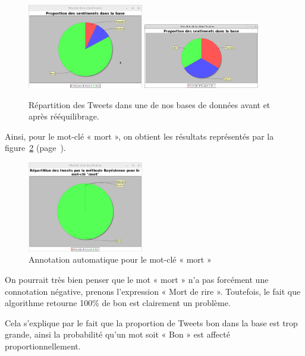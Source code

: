 \documentclass[12pt,a4paper]{report}
\begin{document}
\begin{figure}
	\centering
	\includegraphics[width=0.45\textwidth]{img/resultats_classification_tweetsv7.eps}
	\includegraphics[width=0.45\textwidth]{img/classificationV8.png}
	\caption{Répartition des Tweets dans une de nos bases de données avant
	et après rééquilibrage.}
\label{capture_repartition_Tweetsv7}
\end{figure}

Ainsi, pour le mot-clé « mort », on obtient les résultats représentés par la
figure~\ref{capture_classification_mort_Tweetsv7}
(page~\pageref{capture_classification_mort_Tweetsv7}).

\begin{figure}
	\centering
	\includegraphics[width=0.45\textwidth]{img/bayes_annotation_mort_tweetsv7.eps}
	\caption{Annotation automatique pour le mot-clé « mort »}
\label{capture_classification_mort_Tweetsv7}
\end{figure}

On pourrait très bien penser que le mot « mort » n'a pas forcément une
connotation négative, prenons l'expression « Mort de rire ». Toutefois, le fait
que algorithme retourne 100\% de bon est clairement un problème.

Cela s'explique par le fait que la proportion de Tweets bon dans la base est
trop grande, ainsi la probabilité qu'un mot soit « Bon » est affecté
proportionnellement.
\end{document}
